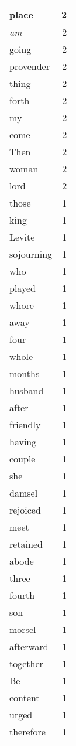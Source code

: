 \begin{center}
\begin{longtable}{l|r}
place & 2 \\ \hline
\emph{am} & 2 \\ \hline
going & 2 \\ \hline
provender & 2 \\ \hline
thing & 2 \\ \hline
forth & 2 \\ \hline
my & 2 \\ \hline
come & 2 \\ \hline
Then & 2 \\ \hline
woman & 2 \\ \hline
lord & 2 \\ \hline
those & 1 \\ \hline
king & 1 \\ \hline
Levite & 1 \\ \hline
sojourning & 1 \\ \hline
who & 1 \\ \hline
played & 1 \\ \hline
whore & 1 \\ \hline
away & 1 \\ \hline
four & 1 \\ \hline
whole & 1 \\ \hline
months & 1 \\ \hline
husband & 1 \\ \hline
after & 1 \\ \hline
friendly & 1 \\ \hline
having & 1 \\ \hline
couple & 1 \\ \hline
she & 1 \\ \hline
damsel & 1 \\ \hline
rejoiced & 1 \\ \hline
meet & 1 \\ \hline
retained & 1 \\ \hline
abode & 1 \\ \hline
three & 1 \\ \hline
fourth & 1 \\ \hline
son & 1 \\ \hline
morsel & 1 \\ \hline
afterward & 1 \\ \hline
together & 1 \\ \hline
Be & 1 \\ \hline
content & 1 \\ \hline
urged & 1 \\ \hline
therefore & 1 \\ \hline

\end{longtable}
\end{center}
